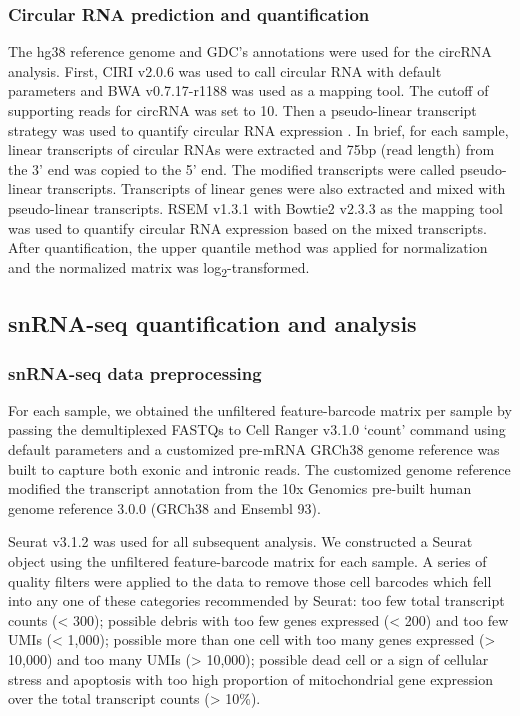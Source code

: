 \subsubsection{Circular RNA prediction and quantification}
The hg38 reference genome and GDC’s annotations were used for the circRNA analysis. First, CIRI v2.0.6 \cite{gaoy_zhaof:CIRIEfficient2015} was used to call circular RNA with default parameters and BWA v0.7.17-r1188 \cite{lih_durbinr:BWAShortRead2009} was used as a mapping tool. The cutoff of supporting reads for circRNA was set to 10. Then a pseudo-linear transcript strategy was used to quantify circular RNA expression \cite{lim_guw:QuantifyingCircular2017}. In brief, for each sample, linear transcripts of circular RNAs were extracted and 75bp (read length) from the 3' end was copied to the 5' end. The modified transcripts were called pseudo-linear transcripts. Transcripts of linear genes were also extracted and mixed with pseudo-linear transcripts. RSEM v1.3.1 \cite{lib_deweycn:RSEMAccurate2011} with Bowtie2 v2.3.3 \cite{langmeadb_salzbergsl:FastGappedread2012} as the mapping tool was used to quantify circular RNA expression based on the mixed transcripts. After quantification, the upper quantile method was applied for normalization and the normalized matrix was log\textsubscript{2}-transformed.


\subsection{snRNA-seq quantification and analysis}

\subsubsection{snRNA-seq data preprocessing}
For each sample, we obtained the unfiltered feature-barcode matrix per sample by passing the demultiplexed FASTQs to Cell Ranger v3.1.0 ‘count’ command using default parameters and a customized pre-mRNA GRCh38 genome reference was built to capture both exonic and intronic reads. The customized genome reference modified the transcript annotation from the 10x Genomics pre-built human genome reference 3.0.0 (GRCh38 and Ensembl 93).

Seurat v3.1.2 \cite{butlera_rahulsatija:IntegratingSinglecell2018,hafemeisterc_satijar:NormalizationVariance2019} was used for all subsequent analysis. We constructed a Seurat object using the unfiltered feature-barcode matrix for each sample. A series of quality filters were applied to the data to remove those cell barcodes which fell into any one of these categories recommended by Seurat: too few total transcript counts (< 300); possible debris with too few genes expressed (< 200) and too few UMIs (< 1,000); possible more than one cell with too many genes expressed (> 10,000) and too many UMIs (> 10,000); possible dead cell or a sign of cellular stress and apoptosis with too high proportion of mitochondrial gene expression over the total transcript counts (> 10\%).


